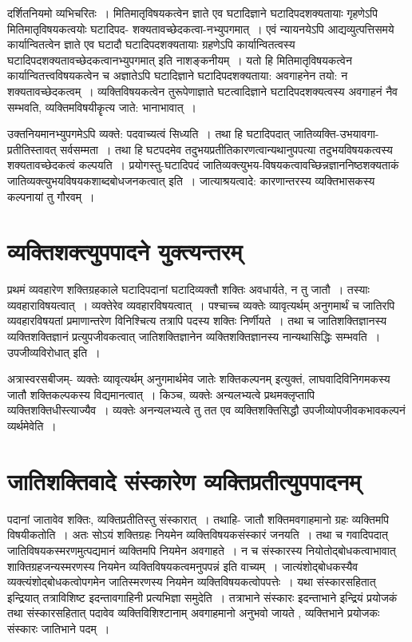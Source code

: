 {दर्शितनियमो व्यभिचरितः~। मितिमातृविषयकत्वेन ज्ञाते एव घटादिज्ञाने घटादिपदशक्यतायाः गृहणेऽपि मितिमातृविषयकत्वयोः घटादिपद- शक्यतावच्छेदकत्वा-नभ्युपगमात्~। एवं न्यायनयेऽपि आद्यव्युत्पत्तिसमये कार्यान्वितत्वेन ज्ञाते एव घटादौ घटादि\-पदशक्यतायाः ग्रहणेऽपि कार्यान्वितत्वस्य घटादिपदशक्यतावच्छेदकत्वानभ्युपगमात् इति नाशङ्कनीयम्~। यतो हि मितिमातृविषयकत्वेन कार्यान्वितत्त्वविषयकत्वेन च अज्ञातेऽपि घटादिज्ञाने घटादिपदशक्यताया: अवगाहनेन तयो: न शक्यतावच्छेदकत्वम्~। व्यक्तिविषयकत्वेन तु\break रूपेणाज्ञाते घटत्वादिज्ञाने घटादिपदशक्यत्वस्य अवगाहनं नैव सम्भवति, व्यक्तिमविषयीकॄत्य जाते: भानाभावात्~। 

उक्तनियमानभ्युपगमेऽपि व्यक्ते: पदवाच्यत्वं सिध्यति~। तथा हि घटादिपदात् जाति\-व्यक्ति-उभयावगा-प्रतीतिस्तावत् सर्वसम्मता~। तथा हि घटपदमेव तदुभयप्रतीतिकारणत्वान्यथानुपपत्या तदुभयविषयकत्वस्य शक्यतावच्छेदकत्वं कल्पयति~। प्रयोगस्तु-घटादिपदं जातिव्यक्त्युभय-विषयकत्वावच्छिन्नज्ञाननिष्ठशक्यताकं जातिव्यक्त्युभयविषयकशाब्द\-\break बोधजनकत्वात् इति~। जात्याश्रयत्वादे: कारणान्तरस्य व्यक्तिभासकस्य कल्पनायां तु \-गौरवम्~। 

\section*{व्यक्तिशक्त्युपपादने युक्त्यन्तरम्} 

प्रथमं व्यवहारेण शक्तिग्रहकाले घटादिपदानां घटादिव्यक्तौ शक्तिः अवधार्यते, न तु जातौ~। तस्याः व्यवहाराविषयत्वात्~। व्यक्तेरेव व्यवहारविषयत्वात्~। पश्चाच्च व्यक्तेः व्यावृत्यर्थम् अनुगमार्थं च जातिरपि व्यवहारविषयतां प्रमाणान्तरेण विनिश्चित्य तत्रापि पदस्य शक्तिः निर्णीयते~। तथा च जातिशक्तिज्ञानस्य व्यक्तिशक्तिज्ञानं प्रत्युपजीवकत्वात् जातिशक्तिज्ञानेन व्यक्तिशक्तिज्ञानस्य नान्यथासिद्धिः सम्भवति~। उपजीव्यविरोधात् इति~। 

अत्रास्वरसबीजम्- व्यक्तेः व्यावृत्यर्थम् अनुगमार्थमेव जातेः शक्तिकल्पनम् इत्युक्तं, लाघवादिविनिगमकस्य जातौ शक्तिकल्पकस्य विद्यमानत्वात्~। किञ्च, व्यक्तेः अन्यलभ्यत्वे प्रथमक्लृप्तापि व्यक्तिशक्तिधीस्त्याज्यैव~। व्यक्तेः अनन्यलभ्यत्वे तु तत एव व्यक्तिशक्तिसिद्धौ उपजीव्योपजीवकभावकल्पनं व्यर्थमेवेति~। 

\section*{जातिशक्तिवादे संस्कारेण व्यक्तिप्रतीत्युपपादनम्}

पदानां जातावेव शक्तिः, व्यक्तिप्रतीतिस्तु संस्कारात्~। तथाहि- जातौ शक्तिमवगाहमानो ग्रहः व्यक्तिमपि विषयीकतोति~। अतः सोऽयं शक्तिग्रहः नियमेन व्यक्तिविषयकसंस्कारं जनयति~। तथा च गवादिपदात् जातिविषयकस्मरणमुत्पद्यमानं व्यक्तिमपि नियमेन अवगाहते~। न च संस्कारस्य नियोतोद्बोधकत्वाभावात् शाक्तिग्रहजन्यस्मरणस्य नियमेन व्यक्तिविषयकत्वमनुपपन्नं इति वाच्यम्~। जात्यंशोद्बोधकस्यैव व्यक्त्यंशोद्बोधकत्वोपगमेन जातिस्मरणस्य नियमेन व्यक्तिविषयकत्वोपपत्तेः~। यथा संस्कारसहितात् इन्द्रियात् तत्राविशिष्ट इदन्तावगाहिनी प्रत्यभिज्ञा  समुदेति~। तत्राभाने संस्कारः इदन्ताभाने इन्द्रियं प्रयोजकं तथा संस्कारसहितात् पदावेव व्यक्तिविशिश्टानाम्  अवगाहमानो अनुभवो जायते , व्यक्तिभाने प्रयोजकः संस्कारः जातिभाने पदम्~। 

}

